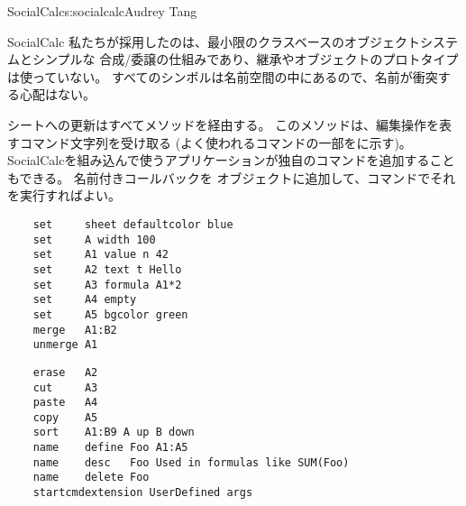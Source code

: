 \begin{aosachapter}{SocialCalc}{s:socialcalc}{Audrey Tang}
\begin{aosasect1}{SocialCalc}
私たちが採用したのは、最小限のクラスベースのオブジェクトシステムとシンプルな
合成/委譲の仕組みであり、継承やオブジェクトのプロトタイプは使っていない。
すべてのシンボルは名前空間の中にあるので、名前が衝突する心配はない。

シートへの更新はすべてメソッドを経由する。
このメソッドは、編集操作を表すコマンド文字列を受け取る
(よく使われるコマンドの一部をに示す)。
SocialCalcを組み込んで使うアプリケーションが独自のコマンドを追加することもできる。
名前付きコールバックを
オブジェクトに追加して、コマンドでそれを実行すればよい。

\begin{table}[ht]
\begin{minipage}[b]{0.4\linewidth}\centering

\begin{verbatim}
    set     sheet defaultcolor blue
    set     A width 100
    set     A1 value n 42
    set     A2 text t Hello
    set     A3 formula A1*2
    set     A4 empty
    set     A5 bgcolor green
    merge   A1:B2
    unmerge A1
\end{verbatim}

\end{minipage}
\hspace{0.5cm}
\begin{minipage}[b]{0.6\linewidth}
\centering

\begin{verbatim}
    erase   A2
    cut     A3
    paste   A4
    copy    A5
    sort    A1:B9 A up B down
    name    define Foo A1:A5
    name    desc   Foo Used in formulas like SUM(Foo)
    name    delete Foo
    startcmdextension UserDefined args
\end{verbatim}


\end{minipage}
\end{table}
\end{aosasect1}
\end{aosachapter}
